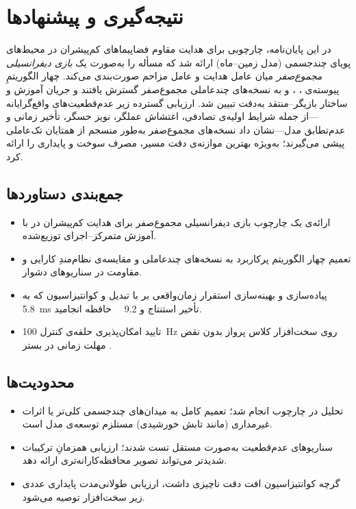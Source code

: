 
\chapter{نتیجه‌گیری و پیشنهادها}
\label{chap:conclusion}

\noindent
در این پایان‌نامه، چارچوبی برای هدایت مقاوم فضاپیماهای کم‌پیشران در محیط‌های پویای چندجسمی (مدل  زمین–ماه) ارائه شد که مسأله را به‌صورت یک \emph{بازی دیفرانسیلی مجموع‌صفر} میان عامل هدایت و عامل مزاحم صورت‌بندی می‌کند. چهار الگوریتمِ پیوسته‌ی ، ،  و  به نسخه‌های چندعاملی مجموع‌صفر گسترش یافتند و جریان آموزش و ساختار بازیگر–منتقد به‌دقت تبیین شد. ارزیابی گسترده زیر عدم‌قطعیت‌های واقع‌گرایانه—از جمله شرایط اولیه‌ی تصادفی، اغتشاش عملگر، نویز حسگر، تأخیر زمانی و عدم‌تطابق مدل—نشان داد نسخه‌های مجموع‌صفر به‌طور منسجم از همتایان تک‌عاملی پیشی می‌گیرند؛ به‌ویژه  بهترین موازنه‌ی دقت مسیر، مصرف سوخت و پایداری را ارائه کرد.

\section*{جمع‌بندی دستاوردها}
\begin{itemize}
  \item ارائه‌ی یک چارچوب بازی دیفرانسیلی مجموع‌صفر برای هدایت کم‌پیشران در  با آموزش متمرکز–اجرای توزیع‌شده.
  \item تعمیم چهار الگوریتم پرکاربرد  به نسخه‌های چندعاملی و مقایسه‌ی نظام‌مندِ کارایی و مقاومت در سناریوهای دشوار.
  \item پیاده‌سازی و بهینه‌سازی استقرار زمان‌واقعی بر  با تبدیل  و کوانتیزاسیون  که به \SI{5.8}{\milli\second} تأخیر استنتاج و \SI{9.2}{\mega\byte} حافظه انجامید.
  \item تایید امکان‌پذیری حلقه‌ی کنترل \SI{100}{\hertz} روی سخت‌افزار کلاس پرواز بدون نقض مهلت زمانی در بستر .
\end{itemize}

\section*{محدودیت‌ها}
\begin{itemize}
  \item تحلیل در چارچوب  انجام شد؛ تعمیم کامل به میدان‌های چندجسمی کلی‌تر یا اثرات غیرمداری (مانند تابش خورشیدی) مستلزم توسعه‌ی مدل است.
  \item سناریوهای عدم‌قطعیت به‌صورت مستقل تست شدند؛ ارزیابی همزمانِ ترکیبات شدیدتر می‌تواند تصویر محافظه‌کارانه‌تری ارائه دهد.
  \item گرچه کوانتیزاسیون  افت دقت ناچیزی داشت، ارزیابی طولانی‌مدت پایداری عددی زیر  سخت‌افزار توصیه می‌شود.
\end{itemize}

